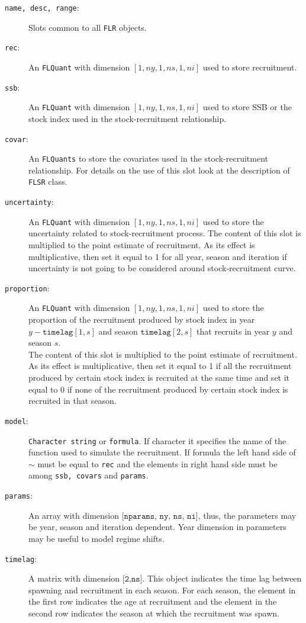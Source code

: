 \begin{description}
  \item[\texttt{name, desc, range}:] Slots common to all \texttt{FLR} objects. 
  \item[\texttt{rec}:] An \texttt{FLQuant} with dimension $[1,ny,1,ns,1,ni]$ used to store recruitment.
	\item[\texttt{ssb}:] An \texttt{FLQuant} with dimension $[1,ny,1,ns,1,ni]$ used to store SSB or the
      stock index used in the stock-recruitment relationship.
	\item[\texttt{covar}:] An \texttt{FLQuants} to store the covariates used in the stock-recruitment relationship.
      For details on the use of this slot look at the description of \texttt{FLSR} class.
	\item[\texttt{uncertainty}:]  An \texttt{FLQuant} with dimension $[1,ny,1,ns,1,ni]$ used to store the uncertainty
      related to stock-recruitment process. The content of this slot is multiplied to the point estimate of recruitment.
      As its effect is multiplicative, then set it equal to 1 for all year, season and iteration if uncertainty is not going to be
      considered around stock-recruitment curve.
	\item[\texttt{proportion}:] An \texttt{FLQuant} with dimension $[1,ny,1,ns,1,ni]$ used to store the proportion of the recruitment produced by stock index in year $y-\texttt{timelag}[1,s]$ and season $\texttt{timelag}[2,s]$ that recruits in year $y$ and season $s$.\\
      The content of this slot is multiplied to the point estimate of recruitment.
      As its effect is multiplicative, then set it equal to 1 if all the recruitment produced by certain stock index is recruited at the same time and set it equal to 0 if  none of the recruitment produced by certain stock index is  recruited in that season.
	\item[\texttt{model}:] \texttt{Character string} or \texttt{formula}. If character it specifies the name of the function used to simulate the recruitment. 
       If formula  the left hand side of $\sim$ must be equal to \texttt{rec} and the elements in right hand side must be 
       among \texttt{ssb, covars} and \texttt{params}.
	\item[\texttt{params}:]	An array with dimension $\texttt{[nparams, ny, ns, ni]}$, 
		thus, the parameters may be year, season and iteration dependent.   
	  Year dimension in parameters may be useful to model regime shifts.
	\item[\texttt{timelag}:] A matrix with dimension $\texttt{[2,ns]}$. This object indicates the time lag between spawning and recruitment in each season.
        For each season, the element in the first row indicates the age at recruitment and the element in 
        the second row indicates the season at which the recruitment was spawn.
\end{description}

